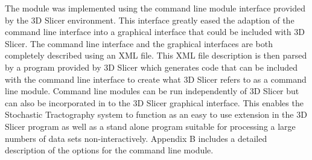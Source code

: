 The module was implemented using the command line module interface provided by the 3D Slicer environment.  This interface greatly eased the adaption of the command line interface into a graphical interface that could be included with 3D Slicer.  The command line interface and the graphical interfaces are both completely described using an XML file.  This XML file description is then parsed by a program provided by 3D Slicer which generates code that can be included with the command line interface to create what 3D Slicer refers to as a command line module.  Command line modules can be run independently of 3D Slicer but can also be incorporated in to the 3D Slicer graphical interface.  This enables the Stochastic Tractography system to function as an easy to use extension in the 3D Slicer program as well as a stand alone program suitable for processing a large numbers of data sets non-interactively.  Appendix B includes a detailed description of the options for the command line module.


